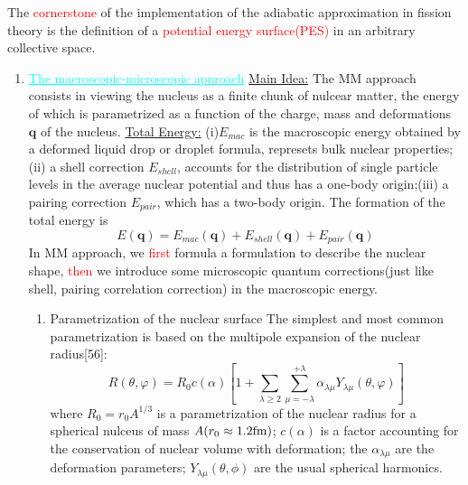 \begin{itemize}[leftmargin=10pt]
        The \textcolor{red}{cornerstone} of the implementation of the adiabatic approximation in fission theory is the definition of a \textcolor{red}{potential energy surface(PES)} in an arbitrary collective space. 
        \begin{enumerate}[leftmargin=10pt]
            \item \textcolor{cyan}{\underline{The macroscopic-microscopic approach}}\newline
                \underline{Main Idea:} The MM approach consists in viewing the nucleus as a finite chunk of nulcear matter, the energy of which is parametrized as a function of the charge, mass and deformations $\bm{q}$ of the nucleus.\newline
                \underline{Total Energy:} (i)$E_{mac}$ is the macroscopic energy obtained by a deformed liquid drop or droplet formula, represets bulk nuclear properties;(ii) a shell correction $E_{shell}$, accounts for the distribution of single particle levels in the average nuclear potential and thus has a one-body origin;(iii) a pairing correction $E_{pair}$, which has a two-body origin. The formation of the total energy is
                \begin{equation}
                    E(\bm{q}) = E_{mac}(\bm{q}) + E_{shell}(\bm{q}) + E_{pair}(\bm{q})
                \end{equation}
                In MM approach, we \textcolor{red}{first} formula a formulation to describe the nuclear shape, \textcolor{red}{then} we introduce some microscopic quantum corrections(just like shell, pairing correlation correction) in the macroscopic energy. 
                \begin{enumerate}
                    \item Parametrization of the nuclear surface \newline
                        The simplest and most common parametrization is based on the multipole expansion of the nuclear radius[56]:
                        \begin{equation}
                            R(\theta, \varphi)=R_{0} c(\alpha)\left[1+\sum_{\lambda \geqslant 2} \sum_{\mu=-\lambda}^{+\lambda} \alpha_{\lambda \mu} Y_{\lambda \mu}(\theta, \varphi)\right]
                        \end{equation}
                        where $R_0 = r_0 A^{1/3}$ is a parametrization of the nuclear radius for a spherical nulceus of mass $A(r_0 \approx 1.2 {\rm fm})$; $c(\alpha)$ is a factor accounting for the conservation of nuclear volume with deformation; the $\alpha_{\lambda\mu}$ are the deformation parameters; $Y_{\lambda\mu}(\theta,\phi)$ are the usual spherical harmonics.
                \end{enumerate}
        \end{enumerate}
    
\end{itemize}
